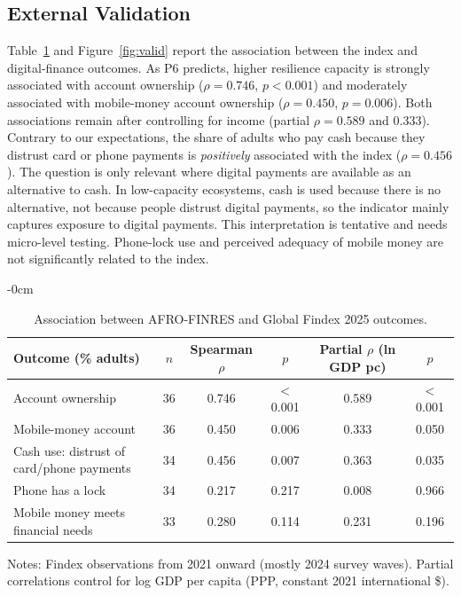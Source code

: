 \documentclass[fintech,article,submit,pdftex,moreauthors]{Definitions/mdpi}
\begin{document}
\subsection{External Validation}\label{sec:valid}

Table~\ref{tab:valid} and Figure~\ref{fig:valid} report the association between the index and digital-finance outcomes. As P6 predicts, higher resilience capacity is strongly associated with account ownership ($\rho=0.746$, $p<0.001$) and moderately associated with mobile-money account ownership ($\rho=0.450$, $p=0.006$). Both associations remain after controlling for income (partial $\rho=0.589$ and $0.333$). Contrary to our expectations, the share of adults who pay cash because they distrust card or phone payments is \emph{positively} associated with the index ($\rho=0.456$). The question is only relevant where digital payments are available as an alternative to cash. In low-capacity ecosystems, cash is used because there is no alternative, not because people distrust digital payments, so the indicator mainly captures exposure to digital payments. This interpretation is tentative and needs micro-level testing. Phone-lock use and perceived adequacy of mobile money are not significantly related to the index.

\begin{table}[H]
\begin{adjustwidth}{-\extralength}{0cm}
\centering
\caption{Association between AFRO-FINRES and Global Findex 2025 outcomes.}
\label{tab:valid}
\small
\begin{threeparttable}
\begin{tabular}{l c c c c c}
\toprule
Outcome (\% adults) & $n$ & Spearman $\rho$ & $p$ & Partial $\rho$ (ln GDP pc) & $p$ \\
\midrule
Account ownership & 36 & 0.746 & $<$0.001 & 0.589 & $<$0.001 \\
Mobile-money account & 36 & 0.450 & 0.006 & 0.333 & 0.050 \\
Cash use: distrust of card/phone payments & 34 & 0.456 & 0.007 & 0.363 & 0.035 \\
Phone has a lock & 34 & 0.217 & 0.217 & 0.008 & 0.966 \\
Mobile money meets financial needs & 33 & 0.280 & 0.114 & 0.231 & 0.196 \\
\bottomrule
\end{tabular}
\begin{tablenotes}\footnotesize
\item Notes: Findex observations from 2021 onward (mostly 2024 survey waves). Partial correlations control for log GDP per capita (PPP, constant 2021 international \$).
\end{tablenotes}
\end{threeparttable}
\end{adjustwidth}
\end{table}
\end{document}
